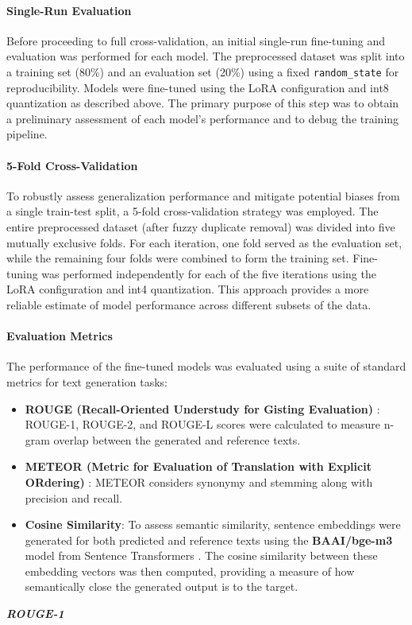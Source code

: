 \documentclass[conference]{IEEEtran}
\begin{document}
\paragraph{Single-Run Evaluation}
\label{sec:single_run_eval}
Before proceeding to full cross-validation, an initial single-run fine-tuning and evaluation was performed for each model. The preprocessed dataset was split into a training set (80\%) and an evaluation set (20\%) using a fixed \texttt{random\_state} for reproducibility. Models were fine-tuned using the LoRA configuration and int8 quantization as described above. The primary purpose of this step was to obtain a preliminary assessment of each model's performance and to debug the training pipeline.

\paragraph{5-Fold Cross-Validation}
\label{sec:cross_validation_eval}
To robustly assess generalization performance and mitigate potential biases from a single train-test split, a 5-fold cross-validation strategy was employed. The entire preprocessed dataset (after fuzzy duplicate removal) was divided into five mutually exclusive folds. For each iteration, one fold served as the evaluation set, while the remaining four folds were combined to form the training set. Fine-tuning was performed independently for each of the five iterations using the LoRA configuration and int4 quantization. This approach provides a more reliable estimate of model performance across different subsets of the data.

\paragraph{Evaluation Metrics}
The performance of the fine-tuned models was evaluated using a suite of standard metrics for text generation tasks:
\begin{itemize}
    \item \textbf{ROUGE (Recall-Oriented Understudy for Gisting Evaluation)} \cite{b11}: ROUGE-1, ROUGE-2, and ROUGE-L scores were calculated to measure n-gram overlap between the generated and reference texts.
    \item \textbf{METEOR (Metric for Evaluation of Translation with Explicit ORdering)} \cite{b12}: METEOR considers synonymy and stemming along with precision and recall.
    \item \textbf{Cosine Similarity}: To assess semantic similarity, sentence embeddings were generated for both predicted and reference texts using the \textbf{BAAI/bge-m3} model from Sentence Transformers \cite{b9}. The cosine similarity between these embedding vectors was then computed, providing a measure of how semantically close the generated output is to the target.
\end{itemize}
\vspace{1em}
\noindent \textbf{\textit{ROUGE-1}}\\
\end{document}
